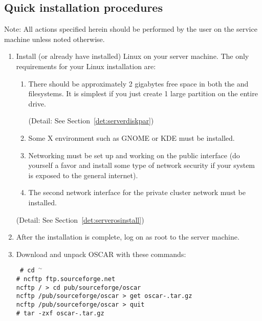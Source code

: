 \subsection{Quick installation procedures}

Note: All actions specified herein should be performed by the
 user on the service machine unless noted otherwise.

\begin {enumerate}
\item Install (or already have installed) Linux on your server
  machine.  The only requirements for your Linux installation are:

  \begin{enumerate}
  \item There should be approximately 2 gigabytes free space in both
    the \file{/} and  filesystems. It is simplest if you
    just create 1 large partition on the entire drive.
    
    (Detail: See Section~\ref{det:serverdiskpar})
  \item Some X environment such as GNOME or KDE must be installed.
  \item Networking must be set up and working on the public interface
    (do yourself a favor and install some type of network security if
    your system is exposed to the general internet).
  \item The second network interface for the private cluster network
    must be installed.
  \end{enumerate}
  
  (Detail: See Section~\ref{det:serverosinstall})
  
\item After the installation is complete, log on as root to the server
  machine.

\item Download and unpack OSCAR with these commands:

  \vspace{11pt}
  {\tt
    \# cd $^\sim$ \\
    \# ncftp ftp.sourceforge.net \\
    ncftp / > cd pub/sourceforge/oscar \\
    ncftp /pub/sourceforge/oscar > get oscar-\oscarversion.tar.gz \\
    ncftp /pub/sourceforge/oscar > quit \\
    \# tar -zxf oscar-\oscarversion.tar.gz
    }
  \vspace{11pt}


\end{enumerate}
